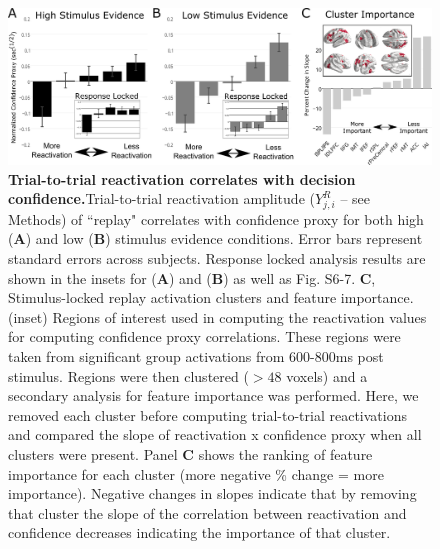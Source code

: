 \begin{figure}[htb!]
\centering
\includegraphics[width=1\textwidth]{Fig7.png}
\caption{\textbf{Trial-to-trial reactivation correlates with decision confidence.}Trial-to-trial reactivation amplitude ($Y^{R}_{j,i}$ – see Methods) of ``replay" correlates with confidence proxy for both high (\textbf{A}) and low (\textbf{B}) stimulus evidence conditions. Error bars represent standard errors across subjects. Response locked analysis results are shown in the insets for (\textbf{A}) and (\textbf{B}) as well as Fig. S6-7. \textbf{C}, Stimulus-locked replay activation clusters and feature importance. (inset) Regions of interest used in computing the reactivation values for computing confidence proxy correlations. These regions were taken from significant group activations from 600-800ms post stimulus.  Regions were then clustered ($> 48$ voxels) and a secondary analysis for feature importance was performed. Here, we removed each cluster before computing trial-to-trial reactivations and compared the slope of reactivation x confidence proxy when all clusters were present.  Panel \textbf{C} shows the ranking of feature importance for each cluster (more negative \% change = more importance). Negative changes in slopes indicate that by removing that cluster the slope of the correlation between reactivation and confidence decreases indicating the importance of that cluster.}
\label{fig:Confidence}
\end{figure}